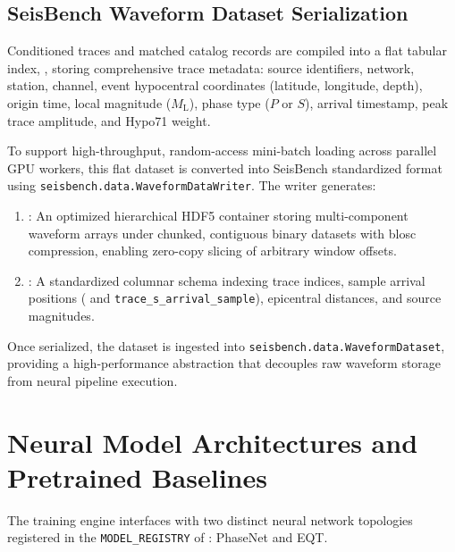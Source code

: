 \subsection{SeisBench Waveform Dataset Serialization}
\label{subsec:seisbench_serialization}

Conditioned traces and matched catalog records are compiled into a flat tabular
index, , storing comprehensive trace metadata:
source identifiers, network, station, channel, event hypocentral coordinates
(latitude, longitude, depth), origin time, local magnitude ($M_{\mathrm{L}}$),
phase type ($P$ or $S$), arrival timestamp, peak trace amplitude, and Hypo71
weight.

To support high-throughput, random-access mini-batch loading across parallel
\ac{GPU} workers, this flat dataset is converted into SeisBench
standardized format
using \texttt{seisbench.data.WaveformDataWriter}. The writer generates:
\begin{enumerate}
  \item {}: An optimized hierarchical HDF5 container storing
    multi-component waveform arrays under chunked, contiguous binary datasets
    with blosc compression, enabling zero-copy slicing of arbitrary
    window offsets.
  \item {}: A standardized columnar schema indexing trace
    indices, sample arrival positions
    ( and
    \texttt{trace\_s\_arrival\_sample}), epicentral distances, and
    source magnitudes.
\end{enumerate}
Once serialized, the dataset is ingested into
\texttt{seisbench.data.WaveformDataset},
providing a high-performance abstraction that decouples raw waveform
storage from
neural pipeline execution.

\section{Neural Model Architectures and Pretrained Baselines}
\label{sec:neural_architectures}

The training engine interfaces with two distinct neural network topologies
registered in the \texttt{MODEL\_REGISTRY} of :
\acf{PhaseNet} and \acf{EQT}.

